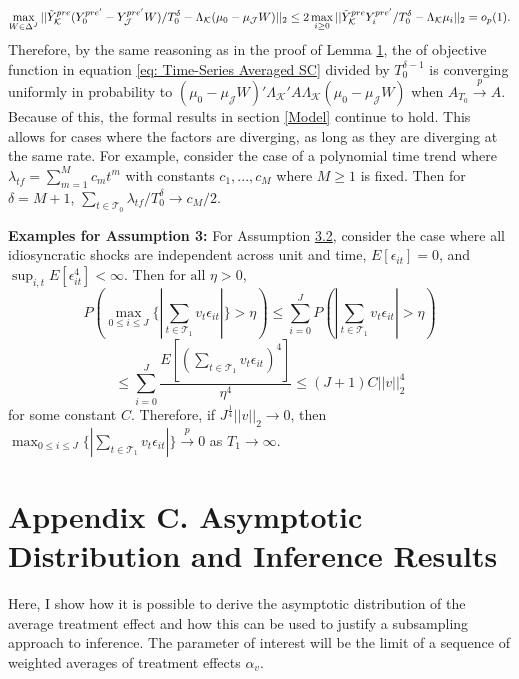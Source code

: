 \documentclass{article}
\begin{document}
$$\max_{W \in \Delta^J}|| \Tilde{Y}_{\mathcal{K}}^{pre}(Y_0^{pre'} - Y_{\mathcal{J}}^{pre'} W)/T_0^\delta - \Lambda_{\mathcal{K}} (\mu_0 - \mu_{\mathcal{J}}W)||_2 \leq 2 \max_{i \geq 0} ||\Tilde{Y}_{\mathcal{K}}^{pre}Y_i^{pre'}/T_0^\delta - \Lambda_{\mathcal{K}} \mu_i ||_2 = o_p(1).$$
Therefore, by the same reasoning as in the proof of Lemma \hyperref[L1]{1}, the of objective function in equation \eqref{eq: Time-Series Averaged SC} divided by $T_0^{\delta -1}$ is converging uniformly in probability to $(\mu_0 - \mu_{\mathcal{J}}W)'\Lambda_{\mathcal{K}}'A \Lambda_{\mathcal{K}}(\mu_0 - \mu_{\mathcal{J}}W)$ when $A_{T_0} \overset{p}{\rightarrow} A$. Because of this, the formal results in section \ref{Model} continue to hold. This allows for cases where the factors are diverging, as long as they are diverging at the same rate. For example, consider the case of a polynomial time trend where $\lambda_{tf} = \sum_{m=1}^M c_m t^m$ with constants $c_1,...,c_M$ where $M \geq 1$ is fixed. Then for $\delta = M+1$, $\sum_{t \in \mathcal{T}_0} \lambda_{tf}/T_0^\delta \rightarrow c_M/2$.

\textbf{Examples for Assumption 3:} For Assumption \hyperref[A3]{3.2}, consider the case where all idiosyncratic shocks are independent across unit and time, $E[\epsilon_{it}] = 0$, and $\sup_{i,t} E[\epsilon_{it}^4] < \infty$. Then $\text{for all } \eta > 0$,
\begin{equation*}
    P(\max_{0 \leq i \leq J} \{ |\sum_{t \in \mathcal{T}_1} v_t \epsilon_{it}|\} > \eta ) \leq \sum_{i=0}^J P(|\sum_{t \in \mathcal{T}_1} v_t \epsilon_{it}| > \eta) 
\end{equation*}
\begin{equation*}
    \leq \sum_{i=0}^J \frac{E[(\sum_{t \in \mathcal{T}_1} v_t \epsilon_{it})^4]}{\eta^4} \leq (J+1) C ||v||_2^4 
\end{equation*}
for some constant $C$. Therefore, if $J^{\frac{1}{4}}||v||_2 \rightarrow 0$, then $\max_{0 \leq i \leq J} \{| \sum_{t \in \mathcal{T}_1} v_t \epsilon_{it} | \} \overset{p}{\rightarrow} 0$ as $T_1 \rightarrow \infty$. 

\section*{Appendix C. Asymptotic Distribution and Inference Results}\label{ApC}

Here, I show how it is possible to derive the asymptotic distribution of the average treatment effect and how this can be used to justify a subsampling approach to inference. The parameter of interest will be the limit of a sequence of weighted averages of treatment effects $\alpha_v$. 
\end{document}
